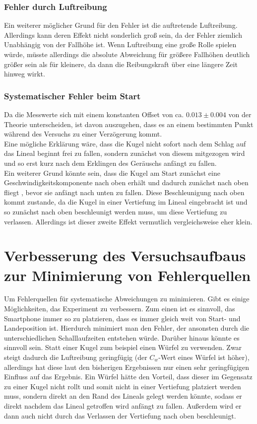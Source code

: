 \documentclass{report}
\begin{document}
    \subsubsection{Fehler durch Luftreibung}
    Ein weiterer möglicher Grund für den Fehler ist die auftretende Luftreibung. Allerdings kann deren Effekt nicht sonderlich groß sein, da der Fehler ziemlich
    Unabhängig von der Fallhöhe ist. Wenn Luftreibung eine große Rolle spielen würde, müsste allerdings die absolute Abweichung für größere Fallhöhen deutlich größer
    sein als für kleinere, da dann die Reibungskraft über eine längere Zeit hinweg wirkt.

    \subsubsection{Systematischer Fehler beim Start}
    Da die Messwerte sich mit einem konstanten Offset von ca. $0.013 \pm 0.004$ von der Theorie unterscheiden, ist davon auszugehen, dass es an einem bestimmten Punkt während des Versuchs
    zu einer Verzögerung kommt. \\
    Eine mögliche Erklärung wäre, dass die Kugel nicht sofort nach dem Schlag auf das Lineal beginnt frei zu fallen, sondern zunächst von diesem mitgezogen wird
    und so erst kurz nach dem Erklingen des Geräuschs anfängt zu fallen. \\
    Ein weiterer Grund könnte sein, dass die Kugel am Start zunächst eine Geschwindigkeitskomponente nach oben erhält und dadurch zunächst nach oben fliegt , bevor sie 
    anfängt nach unten zu fallen. Diese Beschleunigung nach oben kommt zustande, da die Kugel in einer Vertiefung im Lineal eingebracht ist und so zunächst nach oben 
    beschleunigt werden muss, um diese Vertiefung zu verlassen. Allerdings ist dieser zweite Effekt vermutlich vergleichsweise eher klein.

    \section{Verbesserung des Versuchsaufbaus zur Minimierung von Fehlerquellen}
    Um Fehlerquellen für systematische Abweichungen zu minimieren. Gibt es einige Möglichkeiten, das Experiment zu verbessern.
    Zum einen ist es sinnvoll, das Smartphone immer so zu platzieren, dass es immer gleich weit von Start- und Landeposition ist. Hierdurch minimiert man den
    Fehler, der ansonsten durch die unterschiedlichen Schalllaufzeiten entstehen würde.
    Darüber hinaus könnte es sinnvoll sein. Statt einer Kugel zum beispiel einen Würfel zu verwenden. Zwar steigt dadurch die Luftreibung geringfügig (der $C_w$-Wert eines Würfel ist höher),
    allerdings hat diese laut den bisherigen Ergebnissen nur einen sehr geringfügigen Einfluss auf das Ergebnis. Ein Würfel hätte den Vorteil, dass dieser im 
    Gegensatz zu einer Kugel nicht rollt und somit nicht in einer Vertiefung platziert werden muss, sondern direkt an den Rand des Lineals gelegt werden könnte, sodass
    er direkt nachdem das Lineal getroffen wird anfängt zu fallen. Außerdem wird er dann auch nicht durch das Verlassen der Vertiefung nach oben beschleunigt.
\end{document}
